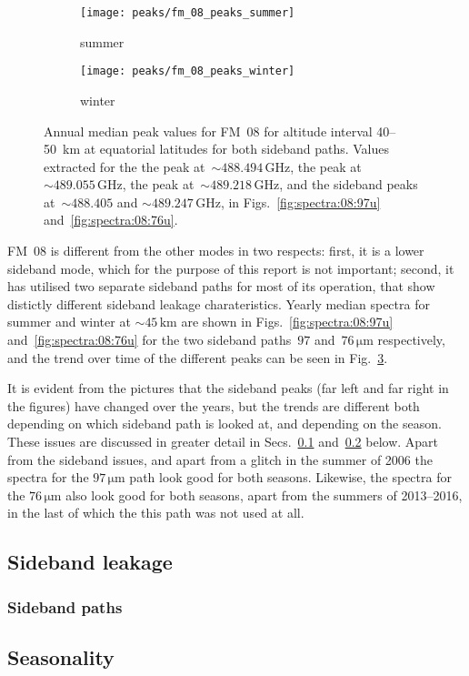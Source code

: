 \begin{figure}[ht]
    \centering
    \begin{subfigure}[b]{0.9545\textwidth}
        \texttt{[image: peaks/fm\_08\_peaks\_summer]}
        \caption{summer}\label{fig:peaks:08:summer}
    \end{subfigure}
    \begin{subfigure}[b]{0.9545\textwidth}
        \texttt{[image: peaks/fm\_08\_peaks\_winter]}
        \caption{winter}\label{fig:peaks:08:winter}
    \end{subfigure}
    \caption{Annual median peak values for FM~08 for altitude interval
        40--50~km at equatorial latitudes for both sideband paths.
        Values extracted for the the  peak
        at~$\sim488.494\,\mathrm{GHz}$, the  peak
        at~$\sim489.055\,\mathrm{GHz}$, the  peak
        at~$\sim489.218\,\mathrm{GHz}$, and the  sideband peaks
        at~$\sim488.405$ and $\sim489.247\,\mathrm{GHz}$,
        in Figs.~\ref{fig:spectra:08:97u} and~\ref{fig:spectra:08:76u}.
        }\label{fig:peaks:08}
\end{figure}

\noindent
FM~08 is different from the other modes in two respects: first, it is a lower
sideband mode, which for the purpose of this report is not important; second,
it has utilised two separate sideband paths for most of its operation, that
show distictly different sideband leakage charateristics.  Yearly median
spectra for summer and winter at $\sim45\,\mathrm{km}$ are shown in
Figs.~\ref{fig:spectra:08:97u} and~\ref{fig:spectra:08:76u} for the two
sideband paths~$97$ and~$76\,\mathrm{\mu m}$ respectively, and the trend over
time of the different peaks can be seen in Fig.~\ref{fig:peaks:08}.

It is evident from the pictures that the sideband peaks (far left and far right
in the figures) have changed over the years, but the trends are different both
depending on which sideband path is looked at, and depending on the season.
These issues are discussed in greater detail in Secs.~\ref{FM08:sbl}
and~\ref{FM08:seasonality} below.  Apart from the sideband issues, and apart
from a glitch in the summer of 2006 the spectra for the $97\,\mathrm{\mu m}$
path look good for both seasons.  Likewise, the spectra for the
$76\,\mathrm{\mu m}$ also look good for both seasons, apart from the summers of
2013--2016, in the last of which the this path was not used at all.


\subsection{Sideband leakage}
\label{FM08:sbl}

\subsubsection{Sideband paths}
\label{FM08:sidebandpaths}

\subsection{Seasonality}
\label{FM08:seasonality}
